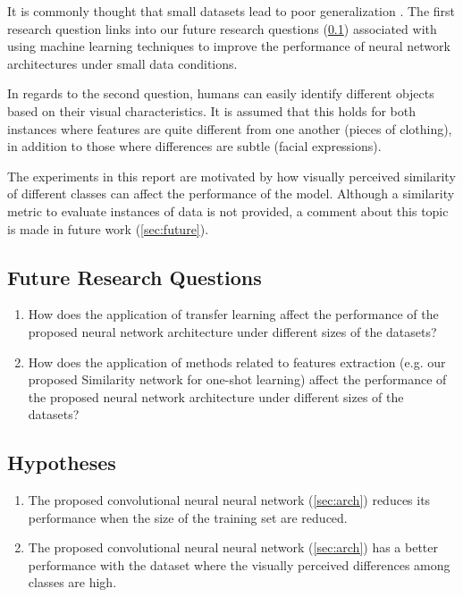 \documentclass{article}
\begin{document}
It is commonly thought that small datasets lead to poor generalization \cite{lotsDataAndrew}. The first research question links into our future research questions (\ref{sec:frquestions}) associated with using machine learning techniques to improve the performance of neural network architectures under small data conditions.

In regards to the second question, humans can easily identify different objects based on their visual characteristics. It is assumed that this holds for both instances where features are quite different from one another (pieces of clothing), in addition to those where differences are subtle (facial expressions). 

The experiments in this report are motivated by how visually perceived similarity of different classes can affect the performance of the model. Although a similarity metric to evaluate instances of data is not provided, a comment about this topic is made in future work (\ref{sec:future}).

\subsection{Future Research Questions}
\label{sec:frquestions}

\begin{enumerate}
  \item How does the application of transfer learning affect the performance of the proposed neural network architecture under different sizes of the datasets?
  \item How does the application of methods related to features extraction (e.g. our proposed Similarity network for one-shot learning) affect the performance of the proposed neural network architecture under different sizes of the datasets?
\end{enumerate}

\subsection{Hypotheses}
\label{sec:hypotheses}
\begin{enumerate}[label=\textbf{H.\arabic*}]
  \item \label{h:1} The proposed convolutional neural neural network (\ref{sec:arch}) reduces its performance when the size of the training set are reduced. 
  \item \label{h:2} The proposed convolutional neural neural network (\ref{sec:arch}) has a better performance with the dataset where the visually perceived differences among classes are high.
 \end{enumerate}
\end{document}
